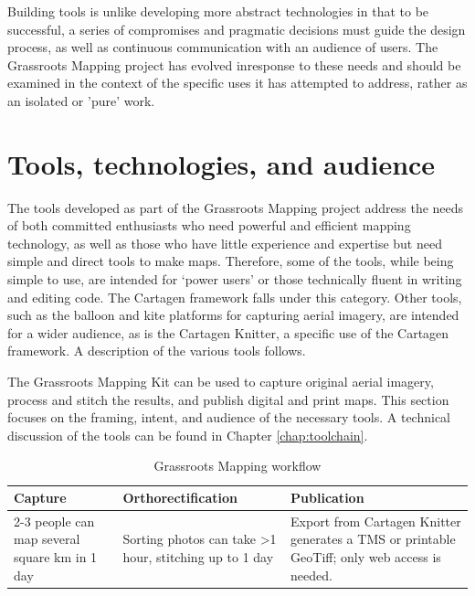 \documentclass[11pt,oneside,notitlepage]{report}
\newcommand{\otoprule}{\midrule[\heavyrulewidth]}
\begin{document}
Building tools is unlike developing more abstract technologies in that to be successful, a series of compromises and pragmatic decisions must guide the design process, as well as continuous communication with an audience of users. The Grassroots Mapping project has evolved inresponse to these needs and should be examined in the context of the specific uses it has attempted to address, rather as an isolated or 'pure' work.

\section{Tools, technologies, and audience}

The tools developed as part of the Grassroots Mapping project address the needs of both committed enthusiasts who need powerful and efficient mapping technology, as well as those who have little experience and expertise but need simple and direct tools to make maps. Therefore, some of the tools, while being simple to use, are intended for `power users' or those technically fluent in writing and editing code. The Cartagen framework falls under this category. Other tools, such as the balloon and kite platforms for capturing aerial imagery, are intended for a wider audience, as is the Cartagen Knitter, a specific use of the Cartagen framework. A description of the various tools follows.

The Grassroots Mapping Kit can be used to capture original aerial imagery, process and stitch the results, and publish digital and print maps. This section focuses on the framing, intent, and audience of the necessary tools. A technical discussion of the tools can be found in Chapter \ref{chap:toolchain}. 

\begin{table}[tp] 
\caption{Grassroots Mapping workflow}
\centering %
\renewcommand{\arraystretch}{1.4}
\begin{tabularx}{\textwidth}{YYY}
\toprule
Capture&Orthorectification&Publication\\\otoprule
2-3 people can map several square km in 1 day&Sorting photos can take \textgreater1 hour, stitching up to 1 day&Export from Cartagen Knitter generates a TMS or printable GeoTiff; only web access is needed.\\\bottomrule 
\end{tabularx}
\end{table}
\end{document}
